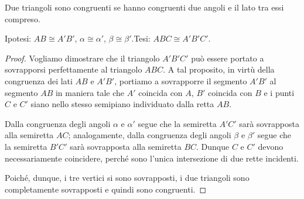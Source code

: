 \begin{teorema}
Due triangoli sono congruenti se hanno congruenti due angoli e il 
lato tra essi compreso.
\end{teorema}


\begin{inaccessibleblock}
 \begin{figure}[htb]
\centering
\end{figure}
\end{inaccessibleblock}

\noindent Ipotesi: \(AB\cong A'B'\), \(\alpha\cong \alpha'\), \(\beta 
\cong \beta'\).\tab Tesi:  \(ABC \cong A'B'C'\).

\begin{proof}
Vogliamo dimostrare che il triangolo \(A'B'C'\) può essere portato a 
sovrapporsi perfettamente al triangolo \(ABC\).
A tal proposito, in virtù della congruenza dei lati \(AB\) e \(A'B'\), 
portiamo a sovrapporre il segmento \(A'B'\) al segmento \(AB\) in maniera 
tale che \(A'\) coincida con \(A\), \(B'\) coincida con \(B\) e i punti \(C\) e 
\(C'\) siano nello stesso semipiano individuato dalla retta \(AB\). 

Dalla congruenza degli angoli \(\alpha\) e \(\alpha'\) segue che la 
semiretta \(A'C'\) sarà sovrapposta alla semiretta \(AC\); analogamente, 
dalla congruenza degli angoli \(\beta\) e \(\beta'\) segue che la 
semiretta \(B'C'\) sarà sovrapposta alla semiretta \(BC\). Dunque \(C\) e 
\(C'\) devono necessariamente coincidere, perché sono l'unica 
intersezione di due rette incidenti.

Poiché, dunque, i tre vertici si sono sovrapposti, i due triangoli 
sono completamente sovrapposti e quindi sono congruenti.
\end{proof}

